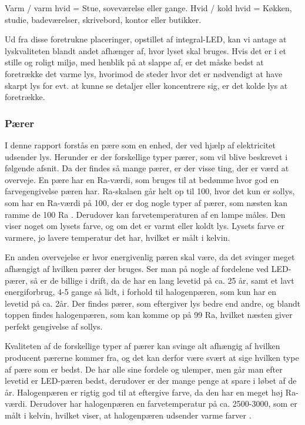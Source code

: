 Varm / varm hvid = Stue, soveværelse eller gange.
Hvid / kold hvid = Køkken, studie, badeværelser, skrivebord, kontor eller butikker\cite{varm_kold}.

Ud fra disse foretrukne placeringer, opstillet af integral-LED, kan vi antage at lyskvaliteten blandt andet afhænger af, hvor lyset skal bruges. Hvis det er i et stille og roligt miljø, med henblik på at slappe af, er det måske bedst at foretrække det varme lys, hvorimod de steder hvor det er nødvendigt at have skarpt lys for evt. at kunne se detaljer eller koncentrere sig, er det kolde lys at foretrække.


\subsubsection{Pærer}
I denne rapport forstås en pære som en enhed, der ved hjælp af elektricitet udsender lys. Herunder er der forskellige typer pærer, som vil blive beskrevet i følgende afsnit.
Da der findes så mange pærer, er der visse ting, der er værd at overveje. En pære har en Ra-værdi, som bruges til at bedømme hvor god en farvegengivelse pæren har. Ra-skalaen går helt op til 100, hvor det kun er sollys, som har en Ra-værdi på 100, der er dog nogle typer af pærer, som næsten kan ramme de 100 Ra \cite{halogen_paere}. Derudover kan farvetemperaturen af en lampe måles. Den viser noget om lysets farve, og om det er varmt eller koldt lys. Lysets farve er varmere, jo lavere temperatur det har, hvilket er målt i kelvin\cite{farvetemperatur}.

En anden overvejelse er hvor energivenlig pæren skal være, da det svinger meget afhængigt af hvilken pærer der bruges. Ser man på nogle af fordelene ved LED-pærer, så er de billige i drift, da de har en lang levetid på ca. 25 år, samt et lavt energiforbrug\cite{LED}, 4-5 gange så lidt, i forhold til halogenpæren, som kun har en levetid på ca. 2år\cite{vaelg_paere}. 
Der findes pærer, som eftergiver lys bedre end andre, og blandt toppen findes halogenpæren, som kan komme op på 99 Ra, hvilket næsten giver perfekt gengivelse af sollys\cite{halogen_paere}. 

Kvaliteten af de forskellige typer af pærer kan svinge alt afhængig af hvilken producent pærerne kommer fra, og det kan derfor være svært at sige hvilken type af pære som er bedst. De har alle sine fordele og ulemper, men går man efter levetid er LED-pæren bedst, derudover er der mange penge at spare i løbet af de år. Halogenpæren er rigtig god til at eftergive farve, da den har en meget høj Ra-værdi. Derudover har halogenpæren en farvetemperatur på ca. 2500-3000, som er målt i kelvin, hvilket viser, at halogenpæren udsender varme farver \cite{farvetemperatur}. 

